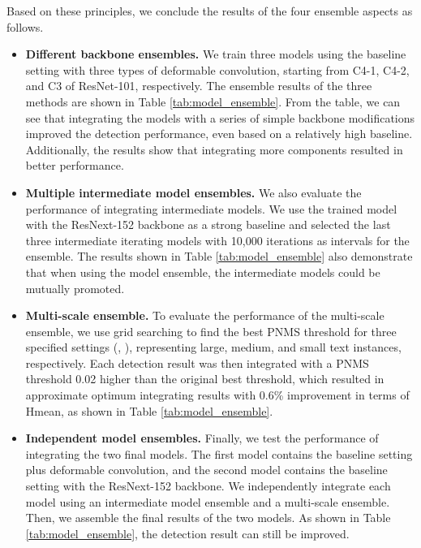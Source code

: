 Based on these principles, we conclude the results of the four ensemble aspects as follows.
\begin{itemize}
  \item {\bf Different backbone ensembles.} We train three models using the baseline setting with three types of deformable convolution, starting from C4-1, C4-2, and C3 of ResNet-101, respectively. The ensemble results of the three methods are shown in Table \ref{tab:model_ensemble}. From the table, we can see that integrating the models with a series of simple backbone modifications improved the detection performance, even based on a relatively high baseline. Additionally, the results show that integrating more components resulted in better performance.
  \item {\bf Multiple intermediate model ensembles.} We also evaluate the performance of integrating intermediate models. We use the trained model with the ResNext-152 backbone as a strong baseline and selected the last three intermediate iterating models with 10,000 iterations as intervals for the ensemble. The results shown in Table \ref{tab:model_ensemble} also demonstrate that when using the model ensemble, the intermediate models could be mutually promoted.
  \item {\bf Multi-scale ensemble.} To evaluate the performance of the multi-scale ensemble, we use grid searching to find the best PNMS threshold for three specified settings (, ), representing large, medium, and small text instances, respectively. Each detection result was then integrated with a PNMS threshold 0.02 higher than the original best threshold, which resulted in approximate optimum integrating results with 0.6\% improvement in terms of Hmean, as shown in Table \ref{tab:model_ensemble}. 
  \item {\bf Independent model ensembles.} Finally, we test the performance of integrating the two final models. The first model contains the baseline setting plus deformable convolution, and the second model contains the baseline setting with the ResNext-152 backbone. We independently integrate each model using an intermediate model ensemble and a multi-scale ensemble. Then, we assemble the final results of the two models. As shown in Table \ref{tab:model_ensemble}, the detection result can still be improved.
\end{itemize}

  
  
